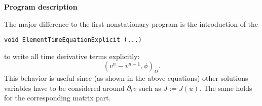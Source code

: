 %
%
\textbf{Program description}

The major difference to the first nonstationary program
is the introduction of the 
\begin{verbatim}
void ElementTimeEquationExplicit (...) 
\end{verbatim}
to write all time derivative terms explicitly:
\begin{equation*}
(v^n - v^{n-1}, \phi)_{\Omega}.
\end{equation*}
This behavior is useful since (as shown in the above equations)
other solutions variables have to be considered
around $\partial_t v$ such as $J:=J(u)$. 
The same holds for the corresponding matrix part.


\vspace{0.2cm}
